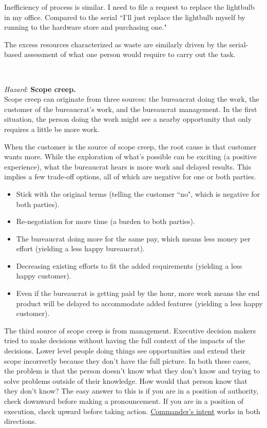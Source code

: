 Inefficiency of process is similar. I need to file a request to replace the lightbulb in my office. Compared to the serial ``I'll just replace the lightbulb myself by running to the hardware store and purchasing one."

The excess resources characterized as waste are similarly driven by the serial-based assessment of what one person would require to carry out the task. 

\ \\

\begin{samepage}
\textit{Hazard}: \textbf{Scope creep.}\label{sec:scope-creep} \\
Scope creep can originate from three sources: the bureaucrat doing the work, the customer of the bureaucrat's work, and the bureaucrat management. In the first situation, the person doing the work might see a nearby opportunity that only requires a little be more work. 
\end{samepage}

When the customer is the source of scope creep, the root cause is that customer wants more. While the exploration of what's possible can be exciting (a positive experience), what the bureaucrat hears is more work and delayed results. This implies a few trade-off options, all of which are negative for one or both parties.
\begin{itemize}
    \item Stick with the original terms (telling the customer ``no", which is negative for both parties).
    \item Re-negotiation for more time (a burden to both parties).
    \item The bureaucrat doing more for the same pay, which means less money per effort (yielding a less happy bureaucrat).
    \item Decreasing existing efforts to fit the added requirements (yielding a less happy customer).
    \item Even if the bureaucrat is getting paid by the hour, more work means the end product will be delayed to accommodate added features (yielding a less happy customer).
\end{itemize}

The third source of scope creep is from management. Executive decision makers tried to make decisions without having the full context of the impacts of the decisions. Lower level people doing things see opportunities and extend their scope incorrectly because they don't have the full picture. In both these cases, the problem is that the person doesn't know what they don't know and trying to solve problems outside of their knowledge. How would that person know that they don't know? The easy answer to this is if you are in a position of authority, check downward before making a pronouncement. If you are in a position of execution, check upward before taking action. \href{https://en.wikipedia.org/wiki/Intent_(military)#Commander's_intent}{Commander's intent}
works in both directions.

